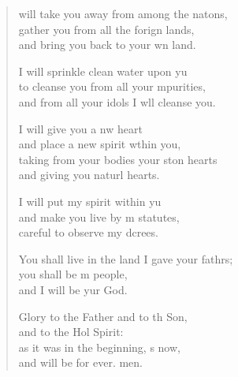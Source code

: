 \begin{verse}
  \begin{patverse}
 will take you away from among the nat\pointup{\i}ons,\Flex\\
gather you from all the forign lands,\Med\\
and bring you back to your wn land.

I will sprinkle clean water upon yu\Flex\\
to cleanse you from all your \pointup{\i}mpurities,\Med\\
and from all your idols I w\pointup{\i}ll cleanse you.

I will give you a nw heart\Med\\
and place a new spirit w\pointup{\i}thin you,\\
taking from your bodies your ston hearts\Med\\
and giving you naturl hearts.

I will put my spirit within yu\Flex\\
and make you live by m statutes,\Med\\
careful to observe my dcrees.

You shall live in the land I gave your fathrs;\Flex\\
you shall be m people,\Med\\
and I will be yur God.

Glory to the Father and to th Son,\Med\\
and to the Hol Spirit:\\
as it was in the beginning, \pointup{\i}s now,\Med\\
and will be for ever. men.
  \end{patverse}
  \end{verse}
